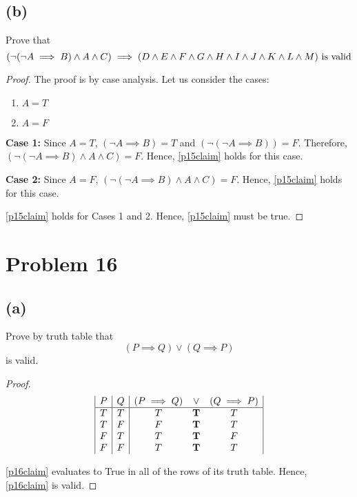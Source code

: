 \documentclass{article}
\begin{document}
\subsection{(b)}
Prove that
\begin{equation}\label{p15claim}
	(\neg (\neg A \implies B) \land A \land C) \implies (D \land E \land F \land G \land H \land I \land J \land K \land L \land M) \\
	\text{ is valid}
\end{equation}

\begin{proof}
	The proof is by case analysis. Let us consider the cases:
	\begin{enumerate}
		\item $A = T$
		\item $A = F$
	\end{enumerate}

	\textbf{Case 1:}
	Since $A = T$, $(\neg A \implies B) = T$ and $(\neg (\neg A \implies B)) = F$. Therefore, $(\neg (\neg A \implies B) \land A \land C) = F$. Hence, \eqref{p15claim} holds for this case.

	\textbf{Case 2:}
	Since $A = F$, $(\neg (\neg A \implies B) \land A \land C) = F$. Hence, \eqref{p15claim} holds for this case.

	\eqref{p15claim} holds for Cases 1 and 2. Hence, \eqref{p15claim} must be true.
\end{proof}

\pagebreak

\section{Problem 16}
\subsection{(a)}
Prove by truth table that
\begin{equation}\label{p16claim}
	(P \implies Q) \lor (Q \implies P)
\end{equation}
is valid.
\begin{proof}
	\[
		\begin{array}{|c|c|c c c|}
			P & Q & (P \implies Q) & \lor       & (Q \implies P) \\
			\hline
			T & T & T              & \mathbf{T} & T              \\
			T & F & F              & \mathbf{T} & T              \\
			F & T & T              & \mathbf{T} & F              \\
			F & F & T              & \mathbf{T} & T
		\end{array}
	\]

	\eqref{p16claim} evaluates to True in all of the rows of its truth table. Hence, \eqref{p16claim} is valid.
\end{proof}
\end{document}
